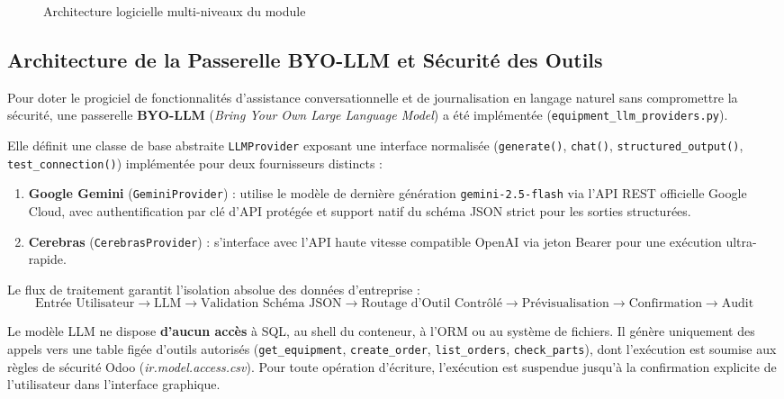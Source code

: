 \begin{figure}[!ht]
\begin{adjustbox}{max width=0.95\textwidth}
    \end{adjustbox}
    \caption{Architecture logicielle multi-niveaux du module \odooModule}
    \label{fig:odoo_architecture}
\end{figure}

\subsection{Architecture de la Passerelle BYO-LLM et Sécurité des Outils}
Pour doter le progiciel de fonctionnalités d'assistance conversationnelle et de journalisation en langage naturel sans compromettre la sécurité, une passerelle \textbf{BYO-LLM} (\textit{Bring Your Own Large Language Model}) a été implémentée (\texttt{equipment\_llm\_providers.py}). 

Elle définit une classe de base abstraite \texttt{LLMProvider} exposant une interface normalisée (\texttt{generate()}, \texttt{chat()}, \texttt{structured\_output()}, \texttt{test\_connection()}) implémentée pour deux fournisseurs distincts :
\begin{enumerate}[leftmargin=1.2cm, label=\textbf{\alph*.}]
    \item \textbf{Google Gemini} (\texttt{GeminiProvider}) : utilise le modèle de dernière génération \texttt{gemini-2.5-flash} via l'API REST officielle Google Cloud, avec authentification par clé d'API protégée et support natif du schéma JSON strict pour les sorties structurées.
    \item \textbf{Cerebras} (\texttt{CerebrasProvider}) : s'interface avec l'API haute vitesse compatible OpenAI via jeton Bearer pour une exécution ultra-rapide.
\end{enumerate}

Le flux de traitement garantit l'isolation absolue des données d'entreprise :
\begin{equation}
\text{Entrée Utilisateur} \rightarrow \text{LLM} \rightarrow \text{Validation Schéma JSON} \rightarrow \text{Routage d'Outil Contrôlé} \rightarrow \text{Prévisualisation} \rightarrow \text{Confirmation} \rightarrow \text{Audit}
\end{equation}

Le modèle LLM ne dispose \textbf{d'aucun accès} à SQL, au shell du conteneur, à l'ORM ou au système de fichiers. Il génère uniquement des appels vers une table figée d'outils autorisés (\texttt{get\_equipment}, \texttt{create\_order}, \texttt{list\_orders}, \texttt{check\_parts}), dont l'exécution est soumise aux règles de sécurité Odoo (\textit{ir.model.access.csv}). Pour toute opération d'écriture, l'exécution est suspendue jusqu'à la confirmation explicite de l'utilisateur dans l'interface graphique.

